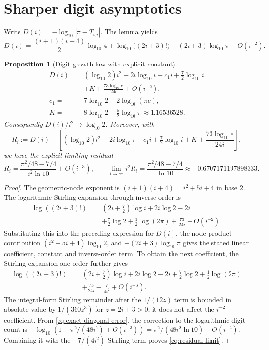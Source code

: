 \documentclass[11pt]{article}
\newtheorem{proposition}{Proposition}
\begin{document}
\section{Sharper digit asymptotics}
Write $D(i)=-\log_{10}|\pi-T_{i,i}|$. The lemma yields
\[
D(i)=\frac{(i+1)(i+4)}2\log_{10}4+\log_{10}\bigl((2i+3)!\bigr)-(2i+3)\log_{10}\pi+O(i^{-2}).
\]
\begin{proposition}[Digit-growth law with explicit constant]\label{prop:digits}
\[
\begin{aligned}
D(i)={}&(\log_{10}2)i^2+2i\log_{10}i+c_1i+\tfrac72\log_{10}i\\
&+K+\frac{73\log_{10}e}{24i}+O(i^{-2}),\\
c_1={}&7\log_{10}2-2\log_{10}(\pi e),\\
K={}&8\log_{10}2-\tfrac52\log_{10}\pi\approx1.16536528.
\end{aligned}
\]
Consequently $D(i)/i^2\to\log_{10}2$. Moreover, with
\[
R_i:=D(i)-\left[(\log_{10}2)i^2+2i\log_{10}i+c_1i+
\tfrac72\log_{10}i+K+\frac{73\log_{10}e}{24i}\right],
\]
we have the explicit limiting residual
\begin{equation}\label{eq:residual-limit}
R_i=\frac{\pi^2/48-7/4}{i^2\ln 10}+O(i^{-3}),\qquad
\lim_{i\to\infty}i^2R_i=\frac{\pi^2/48-7/4}{\ln 10}
\approx-0.6707171197898333.
\end{equation}
\end{proposition}
\begin{proof}
The geometric-node exponent is $(i+1)(i+4)=i^2+5i+4$ in base $2$. The logarithmic Stirling expansion through inverse order is
\[
\begin{aligned}
\log((2i+3)!)={}&(2i+\tfrac72)\log i+2i\log2-2i\\
&+\tfrac72\log2+\tfrac12\log(2\pi)
+\frac{73}{24i}+O(i^{-2}).
\end{aligned}
\]
Substituting this into the preceding expression for $D(i)$, the node-product contribution $(i^2+5i+4)\log_{10}2$, and $-(2i+3)\log_{10}\pi$ gives the stated linear coefficient, constant and inverse-order term. To obtain the next coefficient, the Stirling expansion one order further gives
\[
\begin{aligned}
\log((2i+3)!)={}&(2i+\tfrac72)\log i+2i\log 2-2i
+\tfrac72\log 2+\tfrac12\log(2\pi)\\
&+\frac{73}{24i}-\frac{7}{4i^2}+O(i^{-3}).
\end{aligned}
\]
The integral-form Stirling remainder after the $1/(12z)$ term is bounded in absolute value by $1/(360z^3)$ for $z=2i+3>0$; it does not affect the $i^{-2}$ coefficient. From \eqref{eq:exact-diagonal-error}, the correction to the logarithmic digit count is
$-\log_{10}(1-\pi^2/(48i^2)+O(i^{-3}))
=\pi^2/(48i^2\ln 10)+O(i^{-3})$.
Combining it with the $-7/(4i^2)$ Stirling term proves \eqref{eq:residual-limit}.
\end{proof}
\end{document}
